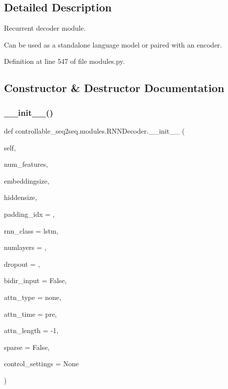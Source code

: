 \subsection{Detailed Description}
\begin{DoxyVerb}Recurrent decoder module.

Can be used as a standalone language model or paired with an encoder.
\end{DoxyVerb}
 

Definition at line 547 of file modules.\+py.



\subsection{Constructor \& Destructor Documentation}
\mbox{\label{classcontrollable__seq2seq_1_1modules_1_1RNNDecoder_a01d95a7a5450b2c5dbe4ad0adbdd0c3c}} 
\subsubsection{\texorpdfstring{\+\_\+\+\_\+init\+\_\+\+\_\+()}{\_\_init\_\_()}}
{\footnotesize\ttfamily def controllable\+\_\+seq2seq.\+modules.\+R\+N\+N\+Decoder.\+\_\+\+\_\+init\+\_\+\+\_\+ (\begin{DoxyParamCaption}\item[{}]{self,  }\item[{}]{num\+\_\+features,  }\item[{}]{embeddingsize,  }\item[{}]{hiddensize,  }\item[{}]{padding\+\_\+idx = {},  }\item[{}]{rnn\+\_\+class = {\ttfamily \textquotesingle{}lstm\textquotesingle{}},  }\item[{}]{numlayers = {},  }\item[{}]{dropout = {},  }\item[{}]{bidir\+\_\+input = {\ttfamily False},  }\item[{}]{attn\+\_\+type = {\ttfamily \textquotesingle{}none\textquotesingle{}},  }\item[{}]{attn\+\_\+time = {\ttfamily \textquotesingle{}pre\textquotesingle{}},  }\item[{}]{attn\+\_\+length = {\ttfamily -\/1},  }\item[{}]{sparse = {\ttfamily False},  }\item[{}]{control\+\_\+settings = {\ttfamily None} }\end{DoxyParamCaption})}

